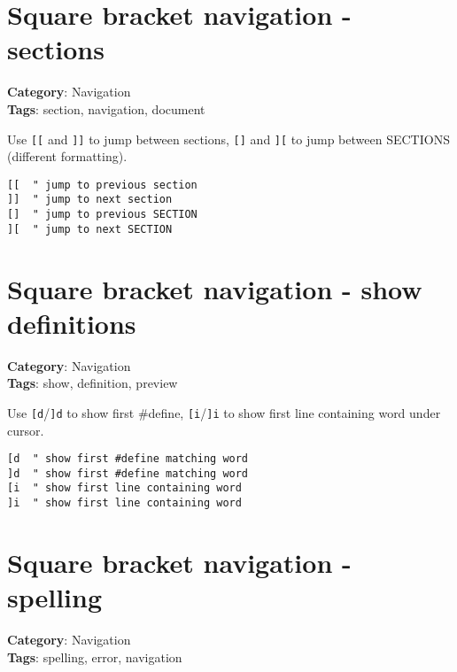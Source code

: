 {{{{{{{{{\section{Square bracket navigation - sections}

\textbf{Category}: Navigation\\ \textbf{Tags}: section, navigation, document
\vspace{0.5cm}

Use {\footnotesize \Verb§[[§} and {\footnotesize \Verb§]]§} to jump between sections, {\footnotesize \Verb§[]§} and {\footnotesize \Verb§][§} to jump between SECTIONS (different formatting).

\begin{Exa*}{}
\begin{Verbatim}[fontsize=\footnotesize, breaklines, breakanywhere]
[[  " jump to previous section
]]  " jump to next section
[]  " jump to previous SECTION
][  " jump to next SECTION
\end{Verbatim}
\end{Exa*}

\section{Square bracket navigation - show definitions}

\textbf{Category}: Navigation\\ \textbf{Tags}: show, definition, preview
\vspace{0.5cm}

Use {\footnotesize \Verb§[d§}/{\footnotesize \Verb§]d§} to show first \#define, {\footnotesize \Verb§[i§}/{\footnotesize \Verb§]i§} to show first line containing word under cursor.

\begin{Exa*}{}
\begin{Verbatim}[fontsize=\footnotesize, breaklines, breakanywhere]
[d  " show first #define matching word
]d  " show first #define matching word
[i  " show first line containing word
]i  " show first line containing word
\end{Verbatim}
\end{Exa*}

\section{Square bracket navigation - spelling}

\textbf{Category}: Navigation\\ \textbf{Tags}: spelling, error, navigation
\vspace{0.5cm}

}}}}}}}}}
